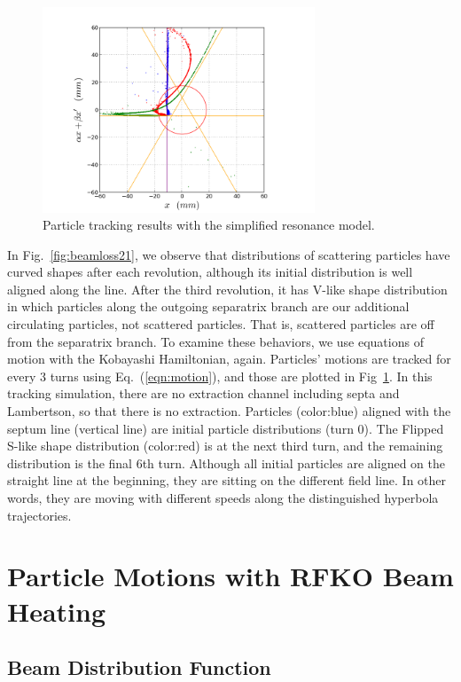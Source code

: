 \documentclass[aps,prstab,onecolumn,preprint,endfloats,11pt]{revtex4-1}
\begin{document}
\begin{figure}[!tbp]
  \includegraphics[width=3.2in]{img/fig_beamloss3}
  \caption{\label{fig:beamloss3} Particle tracking results with the simplified resonance model.}
\end{figure}

In Fig.~\ref{fig:beamloss21}, we observe that distributions of scattering particles have curved shapes after each revolution, although its initial distribution is well aligned along the line. After the third revolution, it has V-like shape distribution in which particles along the outgoing separatrix branch are our additional circulating particles, not scattered particles. That is, scattered particles are off from the separatrix branch. To examine these behaviors, we use equations of motion with the Kobayashi Hamiltonian, again. Particles' motions are tracked for every 3 turns using Eq.~(\ref{eqn:motion}), and those are plotted in Fig~\ref{fig:beamloss3}. In this tracking simulation, there are no extraction channel including septa and Lambertson, so that there is no extraction. Particles (color:blue) aligned with the septum line (vertical line) are initial particle distributions (turn 0). The Flipped S-like shape distribution (color:red) is at the next third turn, and the remaining distribution is the final 6th turn. Although all initial particles are aligned on the straight line at the beginning, they are sitting on the different field line. In other words, they are moving with different speeds along the distinguished hyperbola trajectories. 



\section{\label{sec:rfko}Particle Motions with RFKO Beam Heating}

\subsection{\label{sec:dist}Beam Distribution Function}
\end{document}
